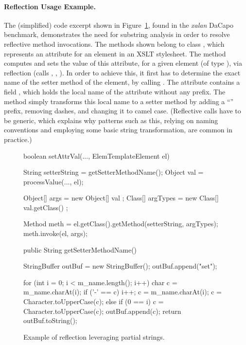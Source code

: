 \paragraph{Reflection Usage Example.}
The (simplified) code excerpt shown in Figure~\ref{reflection/figure:substrings},
found in the \emph{xalan} DaCapo benchmark, demonstrates the need for
substring analysis in order to resolve reflective method
invocations. The methods shown belong to class
,
which represents an attribute for an element in an XSLT
stylesheet. The method  computes and sets the value
of this attribute, for a given element (of type
), via reflection (calls ,
, ). In order to achieve this, it first has
to determine the exact name of the setter method of the element, by
calling . The attribute contains a field
, which holds the local name of the attribute without any
prefix. The method simply transforms this local name to a setter
method by adding a ``'' prefix, removing dashes, and changing
it to camel case. (Reflective calls have to be generic, which explains
why patterns such as this, relying on naming conventions and employing
some basic string transformation, are common in practice.)

\begin{figure}[tb]
  \begin{javacode}
    boolean setAttrVal(..., ElemTemplateElement el) {
        String setterString = getSetterMethodName();
        Object val = processValue(..., el);

        Object[] args = new Object[]{ val };
        Class[] argTypes = new Class[]{ val.getClass() };

        Method meth = el.getClass().getMethod(setterString, argTypes);
        meth.invoke(el, args);
    }

    public String getSetterMethodName() {
        StringBuffer outBuf = new StringBuffer();
        outBuf.append("set");

        for (int i = 0; i < m_name.length(); i++) {
            char c = m_name.charAt(i);
            if ('-' == c) {
                i++;
                c = m_name.charAt(i);
                c = Character.toUpperCase(c);
            }
            else if (0 == i) {
                c = Character.toUpperCase(c);
            }
            outBuf.append(c);
        }
        return outBuf.toString();
    }
  \end{javacode}
  \caption{Example of reflection leveraging partial strings.}
  \label{reflection/figure:substrings}
\end{figure}

